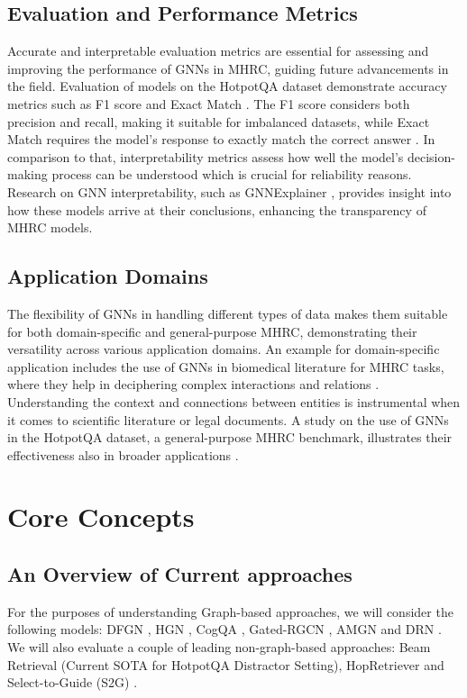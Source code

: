 \documentclass[sigplan,screen,nonacm]{acmart}
\begin{document}
\subsection{Evaluation and Performance Metrics}
Accurate and interpretable evaluation metrics are essential for assessing and improving the performance of GNNs in MHRC, guiding future advancements in the field.
Evaluation of models on the HotpotQA dataset demonstrate accuracy metrics such as F1 score and Exact Match \cite{RN116}. The F1 score considers both precision 
and recall, making it suitable for imbalanced datasets, while Exact Match requires the model's response to exactly match the correct answer \cite{RN116}.
In comparison to that, interpretability metrics assess how well the model's decision-making process can be understood which is crucial for reliability reasons.
Research on GNN interpretability, such as GNNExplainer \cite{RN213}, provides insight into how these models arrive at their conclusions, enhancing the transparency of MHRC models.

\subsection{Application Domains}
The flexibility of GNNs in handling different types of data makes them suitable for both domain-specific and general-purpose MHRC, 
demonstrating their versatility across various application domains. An example for domain-specific application includes the use of GNNs in biomedical literature for MHRC tasks, 
where they help in deciphering complex interactions and relations \cite{RN129}. Understanding the context and connections between entities is instrumental 
when it comes to scientific literature or legal documents. A study on the use of GNNs in the HotpotQA dataset, a general-purpose MHRC benchmark, 
illustrates their effectiveness also in broader applications \cite{RN116}.

\section{Core Concepts}
\subsection{An Overview of Current approaches}
For the purposes of understanding Graph-based approaches, we will consider the following models:
DFGN \cite{RN122}, HGN \cite{RN119}, CogQA \cite{RN118}, Gated-RGCN \cite{RN91}, AMGN \cite{RN131} and DRN \cite{RN142}. We will also evaluate 
a couple of leading non-graph-based approaches: Beam Retrieval \cite{RN105} (Current SOTA for HotpotQA Distractor Setting),
HopRetriever \cite{RN149} and Select-to-Guide (S2G) \cite{RN106}.
\end{document}
